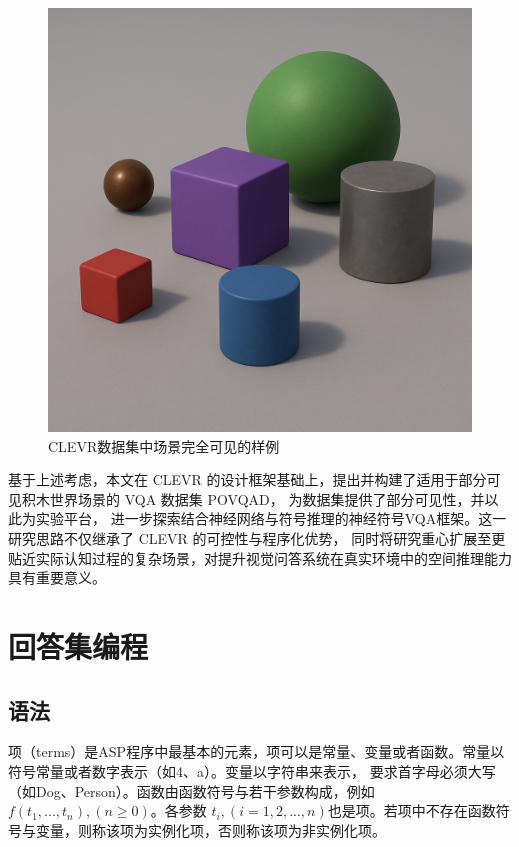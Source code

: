 \begin{figure}[h]
    \centering
    \includegraphics[scale=0.2]{figures/observable.png}
    \caption{CLEVR数据集中场景完全可见的样例}
    \label{observable}
\end{figure}
基于上述考虑，本文在 CLEVR 的设计框架基础上，提出并构建了适用于部分可见积木世界场景的 VQA 数据集 POVQAD，
为数据集提供了部分可见性，并以此为实验平台，
进一步探索结合神经网络与符号推理的神经符号VQA框架。这一研究思路不仅继承了 CLEVR 的可控性与程序化优势，
同时将研究重心扩展至更贴近实际认知过程的复杂场景，对提升视觉问答系统在真实环境中的空间推理能力具有重要意义。
\section{回答集编程}
\subsection{语法}
项（terms）是ASP程序中最基本的元素，项可以是常量、变量或者函数。常量以符号常量或者数字表示（如4、a）。变量以字符串来表示，
要求首字母必须大写（如Dog、Person）。函数由函数符号与若干参数构成，例如$f(t_1,...,t_n),(n \geq 0)$。各参数
$t_i,(i=1,2,...,n)$也是项。若项中不存在函数符号与变量，则称该项为实例化项，否则称该项为非实例化项。

